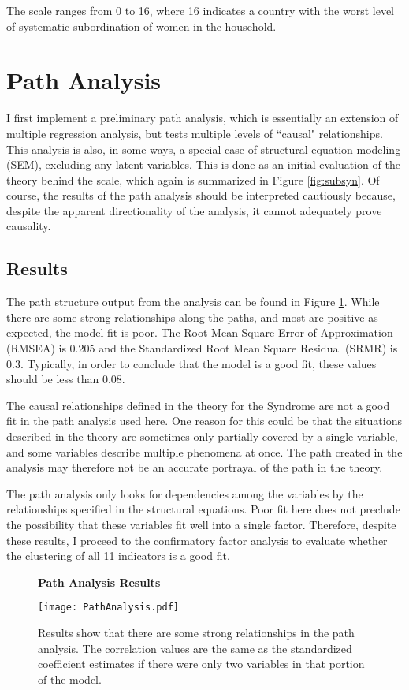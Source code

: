 \documentclass[letterpaper,11pt]{article}
\begin{document}
The scale ranges from 0 to 16, where 16 indicates a country with the worst level of systematic subordination of women in the household.
\section{Path Analysis}

I first implement a preliminary path analysis, which is essentially an extension of multiple regression analysis, but tests multiple levels of ``causal" relationships. This analysis is also, in some ways, a special case of structural equation modeling (SEM), excluding any latent variables. This is done as an initial evaluation of the theory behind the scale, which again is summarized in Figure \ref{fig:subsyn}. Of course, the results of the path analysis should be interpreted cautiously because, despite the apparent directionality of the analysis, it cannot adequately prove causality.

\subsection{Results}

The path structure output from the analysis can be found in Figure \ref{fig:path}. While there are some strong relationships along the paths, and most are positive as expected, the model fit is poor. The Root Mean Square Error of Approximation (RMSEA) is 0.205 and the Standardized Root Mean Square Residual (SRMR) is 0.3. Typically, in order to conclude that the model is a good fit, these values should be less than 0.08. 

The causal relationships defined in the theory for the Syndrome are not a good fit in the path analysis used here. One reason for this could be that the situations described in the theory are sometimes only partially covered by a single variable, and some variables describe multiple phenomena at once. The path created in the analysis may therefore not be an accurate portrayal of the path in the theory.

The path analysis only looks for dependencies among the variables by the relationships specified in the structural equations. Poor fit here does not preclude the possibility that these variables fit well into a single factor. Therefore, despite these results, I proceed to the confirmatory factor analysis to evaluate whether the clustering of all 11 indicators is a good fit. 

\begin{figure}
\centering
  \textbf{Path Analysis Results}\par\medskip
  \texttt{[image: PathAnalysis.pdf]}
  \caption{Results show that there are some strong relationships in the path analysis. The correlation values are the same as the standardized coefficient estimates if there were only two variables in that portion of the model.}
  \label{fig:path}
\end{figure}
\end{document}
